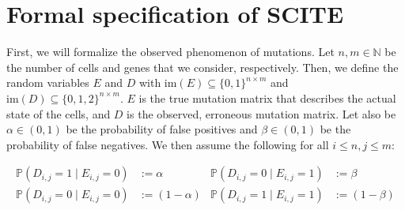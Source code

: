 \section{Formal specification of SCITE}

First, we will formalize the observed phenomenon of mutations. Let $n, m \in \mathbb{N}$ be the number of cells and genes that we consider, respectively. Then, we define the random variables $E$ and $D$ with $\mathrm{im}(E) \subseteq \{0,1\}^{n \times m}$ and $\mathrm{im}(D) \subseteq \{0, 1, 2\}^{n \times m}$. $E$ is the true mutation matrix that describes the actual state of the cells, and $D$ is the observed, erroneous mutation matrix. Let also be $\alpha \in (0,1)$ be the probability of false positives and $\beta \in (0,1)$ be the probability of false negatives. We then assume the following for all $i \leq n, j \leq m$:

\begin{align*}
    \mathbb{P}(D_{i,j} = 1 \mid E_{i,j} = 0) &:= \alpha & \mathbb{P}(D_{i,j} = 0\mid E_{i,j} = 1) &:= \beta \\
    \mathbb{P}(D_{i,j} = 0 \mid E_{i,j} = 0) &:= (1-\alpha) & \mathbb{P}(D_{i,j} = 1 \mid E_{i,j} = 1) &:= (1-\beta)
\end{align*}


